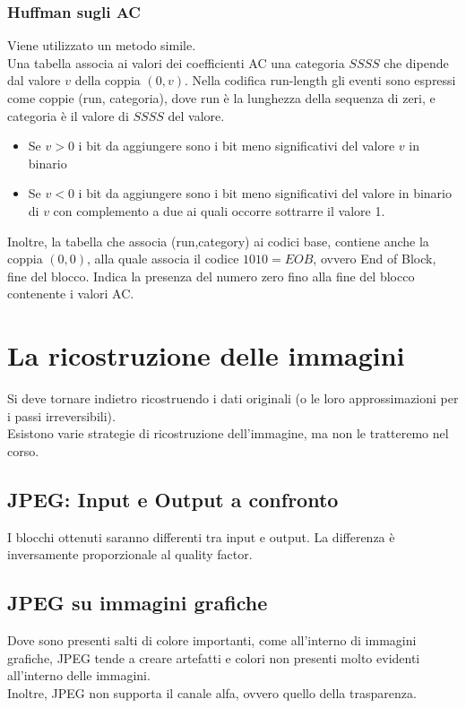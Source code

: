\documentclass{report}
\begin{document}
	\subsubsection{Huffman sugli AC}
	Viene utilizzato un metodo simile.\\
	Una tabella associa ai valori dei coefficienti AC una categoria $SSSS$ che dipende dal valore $v$ della coppia $(0,v)$. Nella codifica run-length gli eventi sono espressi come coppie (run, categoria), dove run è la lunghezza della sequenza di zeri, e categoria è il valore di $SSSS$ del valore.
	\begin{itemize}
		\item Se $v>0$ i bit da aggiungere sono i bit meno significativi del valore $v$ in binario
		      
		\item Se $v<0$ i bit da aggiungere sono i bit meno significativi del valore in binario di $v$ con complemento a due ai quali occorre sottrarre il valore 1.
	\end{itemize}
	Inoltre, la tabella che associa (run,category) ai codici base, contiene anche la coppia $(0,0)$, alla quale associa il codice $1010 = EOB$, ovvero End of Block, fine del blocco. Indica la presenza del numero zero fino alla fine del blocco contenente i valori AC.
	\section{La ricostruzione delle immagini}
	Si deve tornare indietro ricostruendo i dati originali (o le loro approssimazioni per i passi irreversibili).\\
	Esistono varie strategie di ricostruzione dell'immagine, ma non le tratteremo nel corso.
	
	\subsection{JPEG: Input e Output a confronto}
	I blocchi ottenuti saranno differenti tra input e output. La differenza è inversamente proporzionale al quality factor.
	
	\subsection{JPEG su immagini grafiche}
	Dove sono presenti salti di colore importanti, come all'interno di immagini grafiche, JPEG tende a creare artefatti e colori non presenti molto evidenti all'interno delle immagini.\\
	Inoltre, JPEG non supporta il canale alfa, ovvero quello della trasparenza.
	
\end{document}
